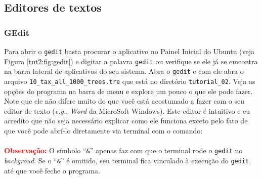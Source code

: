 \begin{refsection}
\subsection{Editores de textos}\label{tut2:text:editors}

\subsubsection{GEdit}\label{tut2:text:editors:gedit}

Para abrir o \texttt{gedit} basta procurar o aplicativo no Painel Inicial do Ubuntu (veja Figura \ref{tut2:fig:gedit}) e digitar a palavra \texttt{gedit} ou verifique se ele já se emcontra na barra lateral de aplicativos do seu sistema. Abra o \texttt{gedit} e com ele abra o arquivo \texttt{10\_tax\_all\_1000\_trees.tre} que está no diretório \texttt{tutorial\_02}. Veja as opções do programa na barra de menu e explore um pouco o que ele pode fazer. Note que ele não difere muito do que você está acostumado a fazer com o seu editor de texto (\textit{e.g.}, \textit{Word} da MicroSoft Windows). Este editor é intuitivo e eu acredito que não seja necessário explicar como ele funciona exceto pelo fato de que você pode abrí-lo diretamente via terminal com o comando:\\

\\

\textcolor{red}{\textbf{Observação:}} O símbolo ``\texttt{\&}'' apenas faz com que o terminal rode o \texttt{gedit} no \textit{backgroud}. Se o ``\texttt{\&}'' é omitido, seu terminal fica vinculado à execução do \texttt{gedit} até que você feche o programa.\\


\end{refsection}
